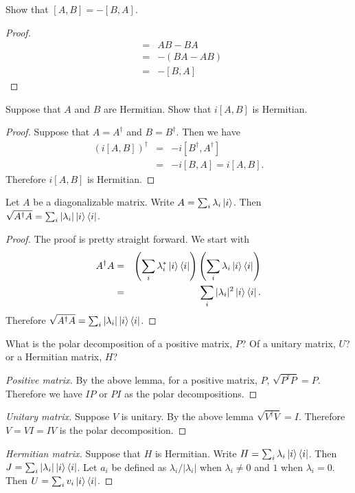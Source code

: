 \documentclass{article}
\begin{document}
\begin{exercise}
  Show that $[A,B]=-[B,A]$.
  \begin{proof}
    \begin{eqnarray*}
      [A,B]&=&AB-BA \\
      &=&- (BA-AB) \\
      &=&-[B,A]
    \end{eqnarray*}
  \end{proof}
\end{exercise}

\begin{exercise}
  Suppose that $A$ and $B$ are Hermitian. Show that $i[A,B]$ is Hermitian.
  \begin{proof}
    Suppose that $A=A^\dagger$ and $B=B^\dagger$. Then we have
    \begin{eqnarray*}
      \left(i[A,B]\right)^\dagger&=&-i[B^\dagger,A^\dagger] \\
      &=&-i[B,A]=i[A,B].
    \end{eqnarray*}
    Therefore $i[A,B]$ is Hermitian.
  \end{proof}
\end{exercise}

\begin{lemma}
  Let $A$ be a diagonalizable matrix. Write $A=\sum_i\lambda_i\ket{i}$. Then $\sqrt{A^\dagger A}=\sum_i|\lambda_i|\ket{i}\bra{i}$.
  \begin{proof}
    The proof is pretty straight forward. We start with
    \begin{eqnarray*}
      A^\dagger A &=& \left(\sum_i \lambda_i^*\ket{i}\bra{i}\right)\left(\sum_i\lambda_i\ket{i}\bra{i}\right) \\
      &=&\sum_i|\lambda_i|^2\ket{i}\bra{i}.
    \end{eqnarray*}
    Therefore $\sqrt{A^\dagger A}=\sum_i|\lambda_i|\ket{i}\bra{i}$.
  \end{proof}
\end{lemma}

\begin{exercise}
What is the polar decomposition of a positive matrix, $P$? Of a unitary matrix, $U$? or a Hermitian matrix, $H$?
\begin{proof}[Positive matrix]
  By the above lemma, for a positive matrix, $P$, $\sqrt{P^\dagger P}=P$. Therefore we have $IP$ or $PI$ as the polar decompositions.
\end{proof}
\begin{proof}[Unitary matrix]
  Suppose $V$ is unitary. By the above lemma $\sqrt{V^\dagger V}=I$. Therefore $V=VI=IV$ is the polar decomposition.
\end{proof}
\begin{proof}[Hermitian matrix]
  Suppose that $H$ is Hermitian. Write $H=\sum_i\lambda_i\ket{i}\bra{i}$. Then $J=\sum_i|\lambda_i|\ket{i}\bra{i}$. Let $a_i$ be defined as $\lambda_i/|\lambda_i|$ when $\lambda_i\ne0$ and $1$ when $\lambda_i=0$. Then $U=\sum_iv_i\ket{i}\bra{i}$.
\end{proof}
\end{exercise}
\end{document}
